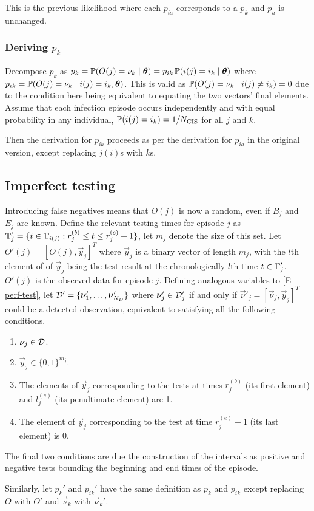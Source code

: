 \documentclass[thesis.tex]{subfiles}
\begin{document}
This is the previous likelihood where each $p_{ia}$ corresponds to a $p_k$ and $p_u$ is unchanged.

\subsubsection{Deriving $p_k$}

Decompose $p_k$ as $p_k = \operatorname{\mathbb{P}}(O(j) = \nu_k \mid \bm{\theta}) = p_{ik} \operatorname{\mathbb{P}}(i(j) = i_k \mid \bm{\theta})$ where $p_{ik} = \operatorname{\mathbb{P}}(O(j) = \nu_k \mid i(j) = i_k, \bm{\theta})$.
This is valid as $\operatorname{\mathbb{P}}(O(j) = \nu_k \mid i(j) \neq i_k) = 0$ due to the condition here being equivalent to equating the two vectors' final elements.
Assume that each infection episode occurs independently and with equal probability in any individual, \ie $\operatorname{\mathbb{P}}(i(j) = i_k) = 1/N_\text{CIS}$ for all $j$ and $k$.

Then the derivation for $p_{ik}$ proceeds as per the derivation for $p_{ia}$ in the original version, except replacing $j(i)$s with $k$s.

\subsection{Imperfect testing}

Introducing false negatives means that $O(j)$ is now a random, even if $B_j$ and $E_j$ are known.
Define the relevant testing times for episode $j$ as $\mathbb{T}'_j = \{ t \in \mathbb{T}_{i(j)} : r_j^{(b)} \leq t \leq r_j^{(e)} + 1 \}$, let $m_j$ denote the size of this set.
Let $O'(j) = [O(j), \vec{y}_j]^T$ where $\vec{y}_j$ is a binary vector of length $m_j$, with the $l$th element of of $\vec{y}_j$ being the test result at the chronologically $l$th time $t \in \mathbb{T}'_j$.
$O'(j)$ is the observed data for episode $j$.
Defining analogous variables to \cref{E-perf-test}, let $\mathcal{D}' = \{ \bm{\nu}'_1, \dots, \bm{\nu}'_{N_D} \}$ where $\bm{\nu}'_j \in \mathcal{D}'_j$ if and only if $\vec{\nu}'_j = [\vec{\nu}_j, \vec{y}_j]^T$ could be a detected observation, equivalent to satisfying all the following conditions.
\begin{enumerate}
  \item $\bm{\nu}_j \in \mathcal{D}$.
  \item $\vec{y}_j \in \{0, 1\}^{m_j}$.
  \item The elements of $\vec{y}_j$ corresponding to the tests at times $r_j^{(b)}$ (its first element) and $l_j^{(e)}$ (its penultimate element) are 1.
  \item The element of $\vec{y}_j$ corresponding to the test at time $r_j^{(e)} + 1$ (its last element) is 0.
\end{enumerate}
The final two conditions are due the construction of the intervals as positive and negative tests bounding the beginning and end times of the episode.

Similarly, let $p_k'$ and $p_{ik}'$ have the same definition as $p_k$ and $p_{ik}$ except replacing $O$ with $O'$ and $\vec{\nu}_k$ with $\vec{\nu}_k'$.
\end{document}
